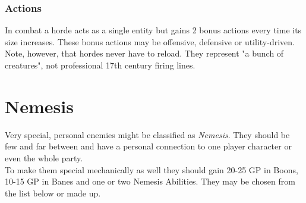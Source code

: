 \documentclass[12pt,a4paper,openany]{book}
\begin{document}
	\subsection*{Actions}
	In combat a horde acts as a single entity but gains 2 bonus actions every time its size increases. These bonus actions may be offensive, defensive or utility-driven. \\
	Note, however, that hordes never have to reload. They represent "a bunch of creatures", not professional 17th century firing lines.


	\chapter{Nemesis}
	Very special, personal enemies might be classified as \emph{Nemesis}. They should be few and far between and have a personal connection to one player character or even the whole party.\\
	To make them special mechanically as well they should gain 20-25 GP in Boons, 10-15 GP in Banes and one or two Nemesis Abilities. They may be chosen from the list below or made up.
\end{document}
